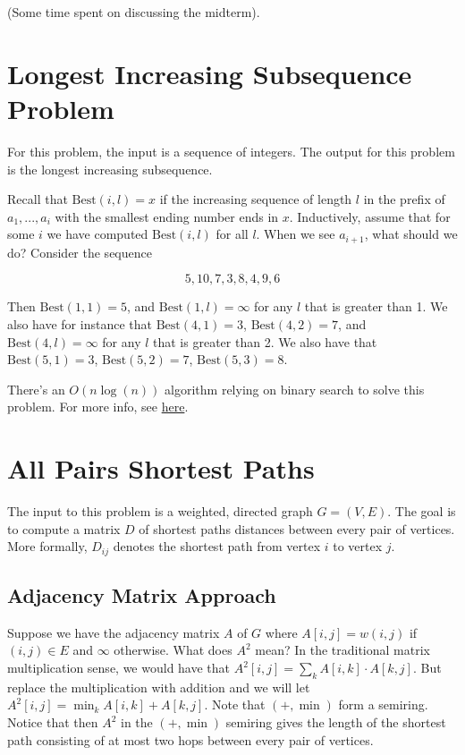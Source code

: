 
(Some time spent on discussing the midterm). 

\section{Longest Increasing Subsequence Problem}

For this problem, the
input is a
sequence of integers.
The output for this problem is the longest increasing subsequence.

Recall that $\text{Best}(i, l) = x$ if the increasing sequence of length $l$
in the prefix of $a_1, ..., a_i$ with the smallest ending number
ends in $x$. Inductively, assume that for some $i$ we have computed
$\text{Best}(i, l)$ for all $l$. When we see $a_{i+1}$, what should we
do? Consider the sequence

$$
5, 10, 7, 3, 8, 4, 9, 6
$$

Then $\text{Best}(1, 1) = 5$, and $\text{Best}(1, l) = \infty$ for any
$l$ that is greater than 1. We also have for instance that
$\text{Best}(4, 1) = 3$, $\text{Best}(4, 2) = 7$, and $\text{Best}(4,
l) = \infty$ for any $l$ that is greater than 2. We also have
that $\text{Best}(5, 1) = 3$, $\text{Best}(5, 2) = 7$,
$\text{Best}(5, 3) = 8$.

There's an $O(n\log(n))$ algorithm relying on binary search to solve
this problem. For more info, see \href{https://en.wikipedia.org/wiki/Longest_increasing_subsequence#Efficient_algorithms}{here}.


\section{All Pairs Shortest Paths}

The input to this problem is a weighted, directed graph $G = (V, E)$.
The goal is to compute a matrix $D$ of shortest paths distances between
every pair of vertices. More formally, $D_{ij}$ denotes the shortest
path from vertex $i$ to vertex $j$.

\subsection{Adjacency Matrix Approach}

Suppose we have the adjacency matrix $A$ of $G$ where
$A[i, j] = w(i, j)$ if $(i, j) \in E$ and $\infty$ otherwise.
What does $A^2$ mean? 
In the traditional matrix multiplication sense, we would have that 
$A^2[i, j] = \sum_k A[i,k] \cdot A[k, j]$. But replace the
multiplication with addition and we will let
$A^2[i, j] = \min_k A[i,k] + A[k, j]$. Note that
$(+, \min)$ form a semiring. Notice that then
$A^2$ in the $(+, \min)$ semiring gives the length of the 
shortest path consisting of at most two hops between every pair
of vertices.

